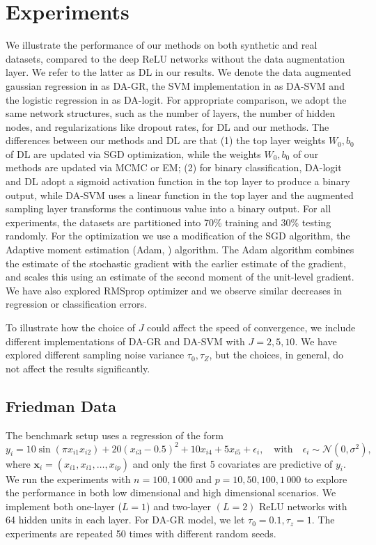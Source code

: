 \documentclass[ba]{imsart}
\newcommand{\bm}[1]{\boldsymbol{#1}}
\def\x{\bm{x}}
\numberwithin{equation}{section}
\theoremstyle{plain}
\begin{document}
\section{Experiments}\label{sec:simu}
We illustrate the performance of our methods on both synthetic and real datasets, compared to the deep ReLU networks without the data augmentation layer. We refer to the latter as DL in our results. We denote the data augmented gaussian regression in  as DA-GR, the SVM implementation in  as DA-SVM and the logistic regression in  as DA-logit. For appropriate comparison, we adopt the same network structures, such as the number of layers, the number of hidden nodes, and  regularizations like dropout rates, for DL and our methods.  The differences between our methods and DL are that (1) the top layer weights ${W_0, b_0}$ of DL are updated via SGD optimization, while the weights ${W_0, b_0}$ of our methods are updated via MCMC or EM; (2) for binary classification, DA-logit and DL adopt a sigmoid activation function in the top layer to produce a binary output, while DA-SVM uses a linear function in the top layer and the augmented sampling layer transforms the continuous value into a binary output. For all experiments, the datasets are partitioned into 70\% training  and 30\% testing randomly. For the optimization we use a modification of the SGD algorithm, the Adaptive moment estimation (Adam, \citet{kingma2014adam}) algorithm. The Adam algorithm combines the estimate of the stochastic gradient with the earlier estimate of the gradient, and scales this using an estimate of the second moment of the unit-level gradient. We have also explored  RMSprop \citep{tieleman2012rmsprop} optimizer and we observe similar decreases in regression or classification errors.

To illustrate how the choice of $J$ could affect the speed of convergence, we include different implementations of DA-GR and DA-SVM with $J=2, 5, 10$. We have explored different sampling noise variance $\tau_0, \tau_Z$, but the choices, in general, do not affect the results significantly. 

\subsection{Friedman Data}\label{sec:friedman}
The benchmark  \citep{friedman1991multivariate}  setup uses a  regression of the form
\[y_i= 10\sin(\pi x_{i1}x_{i2}) + 20(x_{i3} -0.5)^2 + 10x_{i4} + 5x_{i5}+\epsilon_i, \quad \text{with}\quad \epsilon_i\sim\mathcal{N}(0,\sigma^2),\]
where $\x_i= (x_{i1}, x_{i1}, \ldots, x_{ip})$ and only the first 5 covariates are predictive of $y_i$. We run the experiments with $n=100, 1\,000$ and $p=10, 50 , 100, 1\,000$ to explore the performance in both low dimensional and high dimensional scenarios. We implement both one-layer ($L=1$) and two-layer $(L=2)$ ReLU networks with 64 hidden units in each layer. For DA-GR model, we let $\tau_0=0.1, \tau_z=1$.  The experiments are repeated 50 times with different random seeds.
\end{document}
